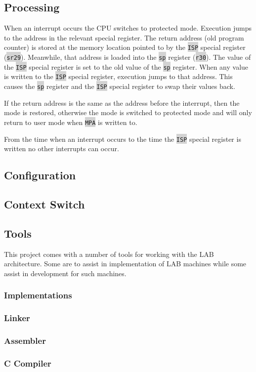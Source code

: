 \documentclass{article}
\newcommand{\labcode}[1]{\colorbox{lightgray}{\lstinline[language=lab]{#1}}}
\begin{document}
\subsection{Processing}

When an interrupt occurs the CPU switches to protected mode. Execution jumps to
the address in the relevant special register. The return address (old program
counter) is stored at the memory location pointed to by the \labcode{ISP}
special register (\labcode{sr29}). Meanwhile, that address is loaded into
the \labcode{sp} register (\labcode{r30}). The value of the \labcode{ISP}
special register is set to the old value of the \labcode{sp} register. When any
value is written to the \labcode{ISP} special register, execution jumps to that
address. This causes the \labcode{sp} register and the \labcode{ISP} special
register to swap their values back.

If the return address is the same as the address before the interrupt, then the
mode is restored, otherwise the mode is switched to protected mode and will only
return to user mode when \labcode{MPA} is written to.

From the time when an interrupt occurs to the time the \labcode{ISP} special
register is written no other interrupts can occur.

\subsection{Configuration}


\subsection{Context Switch}


\subsection{Tools}

This project comes with a number of tools for working with the LAB architecture.
Some are to assist in implementation of LAB machines while some assist in
development for such machines.

\subsubsection{Implementations}
\subsubsection{Linker}
\subsubsection{Assembler}
\subsubsection{C Compiler}
\end{document}
